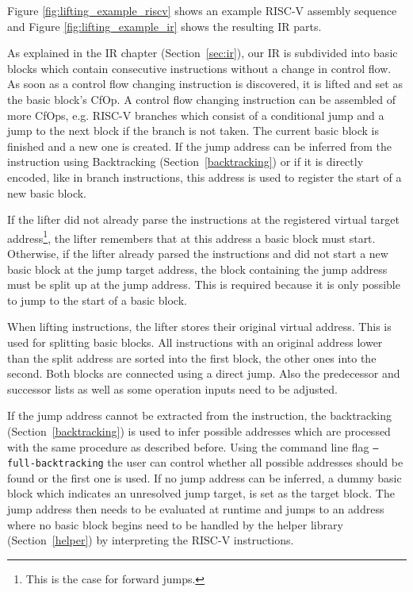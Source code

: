 \documentclass[course=eragp]{aspdoc}
\begin{document}
\par

Figure \ref{fig:lifting_example_riscv} shows an example RISC-V assembly sequence and Figure
\ref{fig:lifting_example_ir} shows the resulting IR parts.

\par

As explained in the IR chapter (Section~\ref{sec:ir}), our IR is subdivided into basic blocks which contain
consecutive instructions without a change in control flow. As soon as a control flow changing
instruction is discovered, it is lifted and set as the basic block's CfOp. A control flow changing
instruction can be assembled of more CfOps, e.g. RISC-V branches which consist of a conditional
jump and a jump to the next block if the branch is not taken. The current basic block is finished and
a new one is created. If the jump address can be inferred from the instruction using
Backtracking (Section~\ref{backtracking}) or if it is directly encoded, like in branch instructions, this address is used
to register the start of a new basic block.

\par

If the lifter did not already parse the instructions at the registered virtual target
address\footnote{This is the case for forward jumps.}, the
lifter remembers that at this address a basic block must start.
Otherwise, if the lifter already parsed the instructions and did not start a new basic block at the
jump target address, the block containing the jump address must be split up at the jump address.
This is required because it is only possible to jump to the start of a basic block.

\par

When lifting instructions, the lifter stores their original virtual address. This is used for
splitting basic blocks. All instructions with an original address lower than the split address are
sorted into the first block, the other ones into the second. Both blocks are connected using a
direct jump. Also the predecessor and successor lists as well as some operation inputs need to be
adjusted.

\par

If the jump address cannot be extracted from the instruction, the backtracking (Section~\ref{backtracking})
is used to infer possible addresses which are processed with the same procedure as described before.
Using the command line flag \texttt{--full-backtracking} the user can control whether all possible
addresses should be found or the first one is used. If no jump address can be inferred, a dummy
basic block which indicates an unresolved jump target, is set as the target block. The jump address then
needs to be evaluated at runtime and jumps to an address where no basic block begins need to be
handled by the helper library (Section~\ref{helper}) by interpreting the RISC-V instructions.
\end{document}
